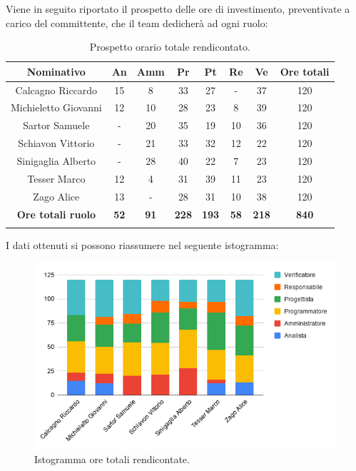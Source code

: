 Viene in seguito riportato il prospetto delle ore di investimento, preventivate a carico del committente, che il team dedicherà ad ogni ruolo:
\begin{longtable}{|c|c|c|c|c|c|c|c|}
	\hline
	\rowcolor[HTML]{F9CB9C} 
	\textbf{Nominativo} & \textbf{An} & \textbf{Amm} & \textbf{Pr} & \textbf{Pt} & \textbf{Re} & \textbf{Ve} & \textbf{Ore totali} \\
	\hline
	Calcagno Riccardo &
	15 &
	8 &
	33 &
	27 &
	- &
	37 &
	120 \\
	\hline
	Michieletto Giovanni &
	12 &
	10 &
	28 &
	23 &
	8 &
	39 &
	120 \\
	\hline
	Sartor Samuele & 
	- &
	20 &
	35 &
	19 &
	10 &
	36 &
	120 \\
	\hline
	Schiavon Vittorio & 
	- &
	21 &
	33 &
	32 &
	12 &
	22 &
	120 \\
	\hline
	Sinigaglia Alberto & 
	- &
	28 &
	40 &
	22 &
	7 &
	23 &
	120 \\
	\hline
	Tesser Marco &
	12 &
	4 &
	31 &
	39 &
	11 &
	23 &
	120 \\
	\hline
	Zago Alice &
	13 &
	- &
	28 &
	31 &
	10 &
	38 &
	120 \\
	\hline	
	\rowcolor[HTML]{F9CB9C} 
	\textbf{Ore totali ruolo} & \textbf{52} & \textbf{91} & \textbf{228} & \textbf{193} & \textbf{58} & \textbf{218} & \textbf{840} \\
	\hline
	\caption{Prospetto orario totale rendicontato.}
	\label{fig: Prospetto orario totale rendicontato.}
\end{longtable}

I dati ottenuti si possono riassumere nel seguente istogramma:
\begin{figure}[H]
	\centering
	\includegraphics[width=0.8\linewidth]{./res/images/OreRendicontate.png}
	\caption{Istogramma ore totali rendicontate.}
	\label{fig: Istogramma ore totali rendicontate.}
\end{figure}

